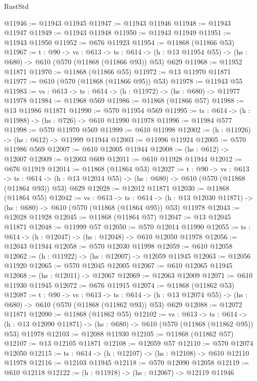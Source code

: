 \begin{lexlean}{RustStd}
\begin{coremodule}
@11946 := @11943 @11945
@11947 := @11943 @11946
@11948 := @11943 @11947
@11949 := @11943 @11948
@11950 := @11943 @11949
@11951 := @11943 @11950
@11952 := @676 @11923
@11954 := @11868 (@11866 @53)
@11967 := {t : @90} ->
  {vs : @613} ->
  {ts : @614} -> (h : @13 @11954 @55) -> (hs : @680) -> @610 (@570 (@11868 (@11866 @93)) @53) @629
@11968 := @11952 @11871
@11970 := @11868 (@11866 @55)
@11972 := @13 @11970 @11871
@11977 := @610 (@570 (@11868 (@11866 @95)) @53)
@11978 := @11943 @55
@11983 := {vs : @613} -> {ts : @614} -> (h : @11972) -> (hs : @680) -> @11977 @11978
@11984 := @11968 @569
@11986 := @11868 (@11866 @57)
@11988 := @13 @11986 @11871
@11990 := @570 @11954 @569
@11995 := {ts : @614} -> (h : @11988) -> (hs : @726) -> @610 @11990 @11978
@11996 := @11984 @577
@11998 := @570 @11970 @569
@11999 := @610 @11998
@12002 := (h : @11926) -> (hs : @612) -> @11999 @11944
@12003 := @11996 @11924
@12005 := @570 @11986 @569
@12007 := @610 @12005 @11944
@12008 := (hs : @612) -> @12007
@12009 := @12003 @609
@12011 := @610 @11928 @11944
@12012 := @676 @11919
@12014 := @11868 (@11864 @53)
@12027 := {t : @90} ->
  {vs : @613} ->
  {ts : @614} -> (h : @13 @12014 @55) -> (hs : @680) -> @610 (@570 (@11868 (@11864 @93)) @53) @629
@12028 := @12012 @11871
@12030 := @11868 (@11864 @55)
@12042 := {vs : @613} ->
  {ts : @614} ->
  (h : @13 @12030 @11871) -> (hs : @680) -> @610 (@570 (@11868 (@11864 @95)) @53) @11978
@12043 := @12028 @11928
@12045 := @11868 (@11864 @57)
@12047 := @13 @12045 @11871
@12048 := @11999 @57
@12050 := @570 @12014 @11990
@12055 := {ts : @614} -> (h : @12047) -> (hs : @12048) -> @610 @12050 @11978
@12056 := @12043 @11944
@12058 := @570 @12030 @11998
@12059 := @610 @12058
@12062 := (h : @11922) -> (hs : @12007) -> @12059 @11945
@12063 := @12056 @11920
@12065 := @570 @12045 @12005
@12067 := @610 @12065 @11945
@12068 := (hs : @12011) -> @12067
@12069 := @12063 @12009
@12071 := @610 @11930 @11945
@12072 := @676 @11915
@12074 := @11868 (@11862 @53)
@12087 := {t : @90} ->
  {vs : @613} ->
  {ts : @614} -> (h : @13 @12074 @55) -> (hs : @680) -> @610 (@570 (@11868 (@11862 @93)) @53) @629
@12088 := @12072 @11871
@12090 := @11868 (@11862 @55)
@12102 := {vs : @613} ->
  {ts : @614} ->
  (h : @13 @12090 @11871) -> (hs : @680) -> @610 (@570 (@11868 (@11862 @95)) @53) @11978
@12103 := @12088 @11930
@12105 := @11868 (@11862 @57)
@12107 := @13 @12105 @11871
@12108 := @12059 @57
@12110 := @570 @12074 @12050
@12115 := {ts : @614} -> (h : @12107) -> (hs : @12108) -> @610 @12110 @11978
@12116 := @12103 @11945
@12118 := @570 @12090 @12058
@12119 := @610 @12118
@12122 := (h : @11918) -> (hs : @12067) -> @12119 @11946

\end{coremodule}
\end{lexlean}
